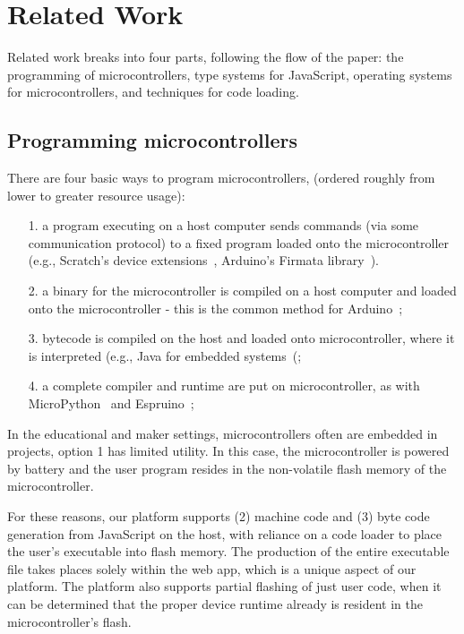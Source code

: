 \section{Related Work}
\label{sec:related}

Related work breaks into four parts, following the
flow of the paper: the programming of microcontrollers,
type systems for JavaScript, operating systems
for microcontrollers, and techniques for code loading.

\subsection{Programming microcontrollers}

There are four basic ways to program microcontrollers,
(ordered roughly from lower to greater resource usage):
\begin{itemize}
\item[1.] a program executing on a host computer sends commands (via some communication protocol) 
to a fixed program loaded onto the microcontroller (e.g., Scratch's
device extensions~\cite{ScratchCACM2009}, Arduino's Firmata library~\cite{Firmata}).
\item[2.] a binary for the microcontroller is compiled on a host computer and loaded onto the microcontroller -
this is the common method for Arduino~\cite{buildingArduino2014};
\item[3.] bytecode is compiled on the host and loaded onto microcontroller, where it is interpreted
(e.g., Java for embedded systems~\cite{ClausenTOPLAS}(;
\item[4.] a complete compiler and runtime are put on microcontroller, as with MicroPython~\cite{MicroPython} 
and Espruino~\cite{Espruino};
\end{itemize}

In the educational and maker settings, microcontrollers often are embedded in projects,
option 1 has limited utility. In this case, the microcontroller is powered by battery and
the user program resides in the non-volatile flash memory of the microcontroller. 

For these reasons, our platform supports (2) machine code and (3) byte code generation 
from JavaScript on the host, with reliance on a code loader to place the user's executable 
into flash memory.  The production of the entire executable file
takes places solely within the web app, which is a unique aspect of our platform.
The platform also supports partial flashing of just user code, 
when it can be determined that the proper device runtime already is resident in the microcontroller's flash.

